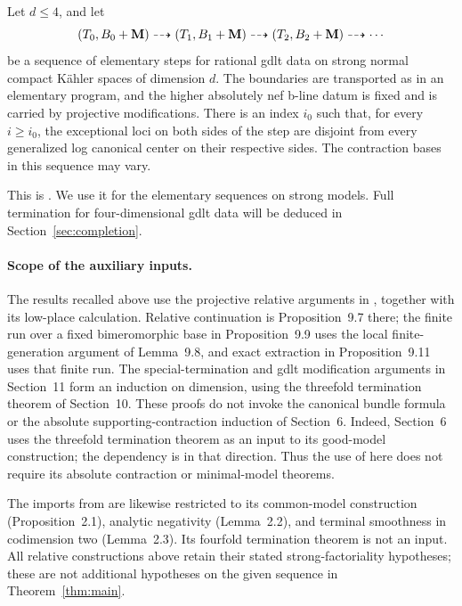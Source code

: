 \begin{theorem}\label{thm:special-termination}
Let \(d\leq4\), and let
\[
 (T_0,B_0+\mathbf{M})\dashrightarrow(T_1,B_1+\mathbf{M})
 \dashrightarrow(T_2,B_2+\mathbf{M})\dashrightarrow\cdots
\]
be a sequence of elementary steps for rational gdlt data on strong normal
compact K\"ahler spaces of dimension \(d\).  The boundaries are transported
as in an elementary program, and the higher absolutely nef b-line datum is fixed and is
carried by projective modifications.  There is an index \(i_0\) such that,
for every \(i\geq i_0\), the exceptional loci on both sides of the step are
disjoint from every generalized log canonical center on their respective
sides.  The contraction bases in this sequence may vary.
\end{theorem}

This is \cite[Theorem~11.3]{KahlerAuxiliary}.  We use it for the elementary
sequences on strong models.  Full termination for four-dimensional gdlt
data will be deduced in Section~\ref{sec:completion}.

\paragraph{Scope of the auxiliary inputs.}
The results recalled above use the projective relative arguments in
\cite[Sections~9--11]{KahlerAuxiliary}, together with its low-place
calculation.  Relative continuation is Proposition~9.7 there; the finite
run over a fixed bimeromorphic base in Proposition~9.9 uses the local
finite-generation argument of Lemma~9.8, and exact extraction in
Proposition~9.11 uses that finite run.  The special-termination and gdlt
modification arguments in Section~11 form an induction on dimension,
using the threefold termination theorem of Section~10.  These proofs do
not invoke the canonical bundle formula or the absolute
supporting-contraction induction of Section~6.  Indeed, Section~6 uses
the threefold termination theorem as an input to its good-model
construction; the dependency is in that direction.  Thus the use of
\cite{KahlerAuxiliary} here does not require its absolute contraction or
minimal-model theorems.

The imports from \cite{CanonicalKahler} are likewise restricted to its
common-model construction (Proposition~2.1), analytic negativity
(Lemma~2.2), and terminal smoothness in codimension two (Lemma~2.3).
Its fourfold termination theorem is not an input.  All relative
constructions above retain their stated strong-factoriality hypotheses;
these are not additional hypotheses on the given sequence in
Theorem~\ref{thm:main}.

